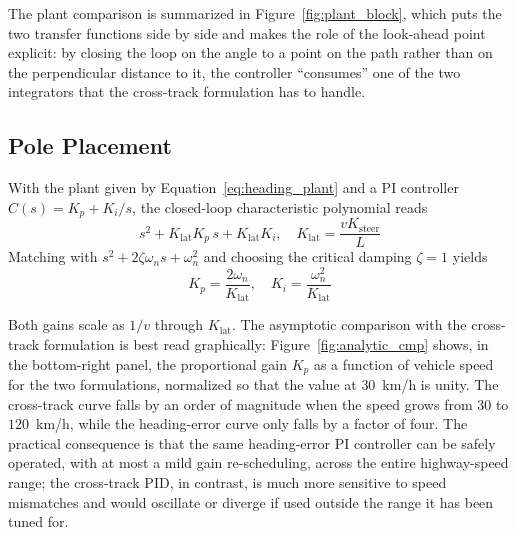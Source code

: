 The plant comparison is summarized in Figure~\ref{fig:plant_block}, which puts the two transfer functions side by side and makes the role of the look-ahead point explicit: by closing the loop on the angle to a point on the path rather than on the perpendicular distance to it, the controller \enquote{consumes} one of the two integrators that the cross-track formulation has to handle.

\subsection{Pole Placement}
With the plant given by Equation~\eqref{eq:heading_plant} and a PI controller $C(s) = K_p + K_i / s$, the closed-loop characteristic polynomial reads
\begin{equation}
    s^2 + K_{\mathrm{lat}} K_p\, s + K_{\mathrm{lat}} K_i, \quad K_{\mathrm{lat}} = \frac{v K_{\mathrm{steer}}}{L}
\end{equation}
Matching with $s^2 + 2\zeta\omega_n s + \omega_n^2$ and choosing the critical damping $\zeta = 1$ yields
\begin{equation}
    K_p = \frac{2\omega_n}{K_{\mathrm{lat}}}, \quad K_i = \frac{\omega_n^2}{K_{\mathrm{lat}}}
    \label{eq:heading_gains}
\end{equation}

Both gains scale as $1/v$ through $K_{\mathrm{lat}}$. The asymptotic comparison with the cross-track formulation is best read graphically: Figure~\ref{fig:analytic_cmp} shows, in the bottom-right panel, the proportional gain $K_p$ as a function of vehicle speed for the two formulations, normalized so that the value at $30$~km/h is unity. The cross-track curve falls by an order of magnitude when the speed grows from $30$ to $120$~km/h, while the heading-error curve only falls by a factor of four. The practical consequence is that the same heading-error PI controller can be safely operated, with at most a mild gain re-scheduling, across the entire highway-speed range; the cross-track PID, in contrast, is much more sensitive to speed mismatches and would oscillate or diverge if used outside the range it has been tuned for.

